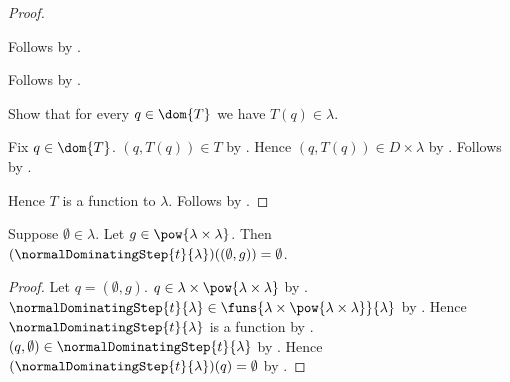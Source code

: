 \begin{proof}
\begin{subproof}
\begin{subproof}
\begin{subproof}
\begin{byCase}
\begin{byCase}
                        \end{byCase}
                \end{byCase}
            \end{subproof}
            Follows by .
        \end{subproof}
        Follows by .
    \end{subproof}
    Show that for every $q\in{}$ we have $T(q)\in\lambda$.
    \begin{subproof}
        Fix $q\in{}$.
        $(q,T(q))\in T$ by .
        Hence $(q,T(q))\in D\times\lambda$ by .
        Follows by .
    \end{subproof}
    Hence $T$ is a function to $\lambda$.
    Follows by .
\end{proof}

\begin{proposition}\label{normal_dominating_step_zero}
    Suppose $\emptyset\in\lambda$.
    Let $g\in\pow{\lambda\times\lambda}$.
    Then $()((\emptyset,g))
        =\emptyset$.
\end{proposition}
\begin{proof}
    Let $q=(\emptyset,g)$.
    $q\in\lambda\times\pow{\lambda\times\lambda}$ by
        .
    $
        \in\funs{\lambda\times\pow{\lambda\times\lambda}}{\lambda}$ by
        .
    Hence $$ is a function by
        .
    $(q,\emptyset)\in{}$ by
        .
    Hence $()(q)=\emptyset$ by
        .
\end{proof}

